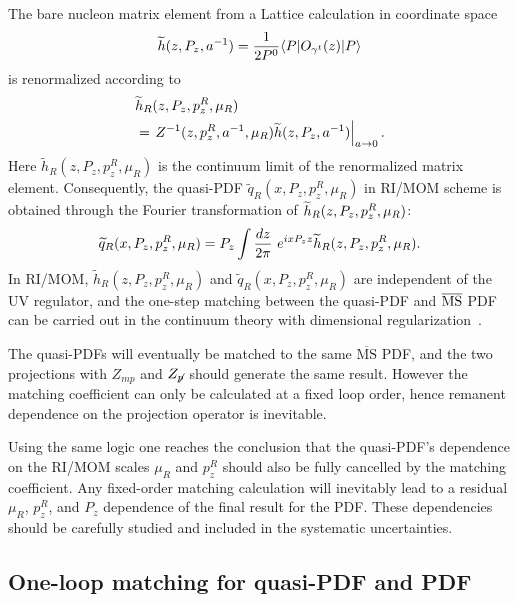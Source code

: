 The bare nucleon matrix element from a Lattice calculation in coordinate space
\begin{align}
\widetilde{h}(z,P_z,a^{-1}) = {1\over 2P^0} \langle P |O_{\gamma^t}(z)| P \rangle \nn
\end{align}
is renormalized according to
\begin{align} \label{eq:rimomh}
&\widetilde{h}_R(z,P_z, p^R_z,\mu_R)\nn\\
&=\left.Z^{-1}(z,p^R_z,a^{-1},\mu_{\tiny R})\widetilde{h}(z,P_z,a^{-1})\right|_{a\to 0} .
\end{align}
Here $\widetilde{h}_R(z,P_z, p^R_z,\mu_R)$ is the continuum limit of the renormalized matrix element. Consequently, the quasi-PDF $\widetilde{q}_R(x,P_z,p^R_z,\mu_R)$ in  RI/MOM scheme is obtained through the Fourier transformation of $\widetilde{h}_R(z,P_z, p^R_z,\mu_{\tiny R})$:
\begin{align}
\widetilde{q}_R(x,P_z, p^R_z,\mu_R) = P_z\int {dz\over 2\pi}\ e^{ix P_zz}\widetilde{h}_R(z,P_z, p^R_z,\mu_R).\nn\\
\end{align}
In RI/MOM,
$\widetilde{h}_R(z,P_z, p^R_z,\mu_R)$ and $\widetilde{q}_R(x,P_z, p^R_z,\mu_R)$ are independent of the UV regulator, and the one-step matching between the quasi-PDF and $\overline{\rm MS}$ PDF can be carried out in the continuum theory with dimensional regularization~\cite{Stewart:2017tvs}.



The quasi-PDFs will eventually be matched to the same $\overline{\text{MS}}$ PDF, and  the two projections with
$Z_{mp}$ and $Z_{\slashed p}$  should  generate the same result. However the matching coefficient
can only be calculated at a fixed loop order, hence remanent  dependence on the projection operator is inevitable.



Using the same logic one reaches the conclusion that the quasi-PDF's dependence on the RI/MOM scales $\mu_R$ and $p_z^R$  should also be fully cancelled by the matching coefficient. Any fixed-order matching calculation will inevitably lead to a residual  $\mu_R$, $p_z^R$, and $P_z$  dependence of the final result for the PDF. These dependencies should  be carefully studied and included in the  systematic uncertainties.


\subsection{One-loop matching for quasi-PDF and PDF}\label{sec:one_loop_matching}

